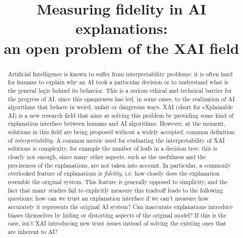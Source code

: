 \documentclass[conference]{IEEEtran}
\begin{document}
\title{Measuring fidelity in AI explanations:\\an open problem of the XAI field}

\author{
    }

\maketitle

\begin{abstract}
    Artificial Intelligence is known to suffer from interpretability problems:
    it is often hard for humans to explain why an AI took a particular decision
    or to understand what is the general logic behind its behavior. This is a
    serious ethical and technical barrier for the progress of AI, since this
    opaqueness has led, in some cases, to the realization of AI algorithms that
    behave in weird, unfair or dangerous ways. XAI (short for eXplainable AI) is
    a new research field that aims at solving this problem by providing some
    kind of explanation interface between humans and AI algorithms. However, at
    the moment, solutions in this field are being proposed without a widely
    accepted, common definition of \textit{interpretability}. A common metric
    used for evaluating the interpretability of XAI solutions is complexity, for
    example the number of leafs in a decision tree: this is clearly not enough,
    since many other aspects, such as the usefulness and the preciseness of the
    explanations, are not taken into account. In particular, a commonly
    overlooked feature of explanations is \textit{fidelity}, i.e. how closely
    does the explanation resemble the original system. This feature is generally
    opposed to simplicity, and the fact that many studies fail to explicitly
    measure this tradeoff leads to the following questions: how can we trust an
    explanation interface if we can't measure how accurately it represents the
    original AI system? Can inaccurate explanations introduce biases themselves
    by hiding or distorting aspects of the original model? If this is the case,
    isn't XAI introducing new trust issues instead of solving the existing ones
    that are inherent to AI?
\end{abstract}

\end{document}
